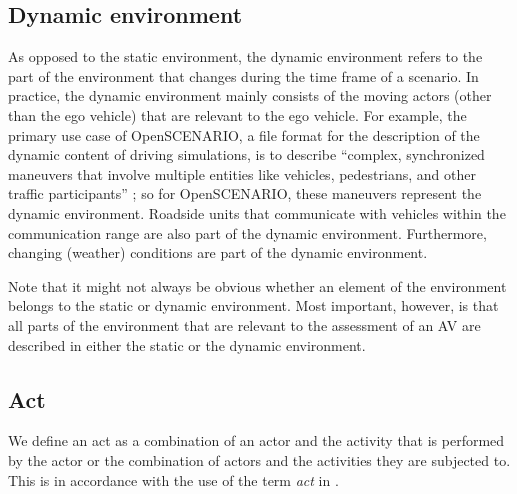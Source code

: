 \subsection{Dynamic environment}
\label{sec:dynamic environment}

As opposed to the static environment, the dynamic environment refers to the part of the environment that changes during the time frame of a scenario. 
In practice, the dynamic environment mainly consists of the moving actors (other than the ego vehicle) that are relevant to the ego vehicle.
For example, the primary use case of OpenSCENARIO, a file format for the description of the dynamic content of driving simulations, is to describe ``complex, synchronized maneuvers that involve multiple entities like vehicles, pedestrians, and other traffic participants'' \autocite{openscenario}; so for OpenSCENARIO, these maneuvers represent the dynamic environment.
Roadside units that communicate with vehicles within the communication range \autocite{alsultan2014comprehensive} are also part of the dynamic environment. Furthermore, changing (weather) conditions are part of the dynamic environment.

\begin{remark}
	Note that it might not always be obvious whether an element of the environment belongs to the static or dynamic environment. 
	Most important, however, is that all parts of the environment that are relevant to the assessment of an AV are described in either the static or the dynamic environment.
\end{remark}



\subsection{Act}
\label{sec:act}

We define an act as a combination of an \cstarte actor \cende and the activity that is performed by the \cstarte actor \cende or the combination of \cstarte actors \cende and the activities they are subjected to.  %
This is in accordance with the use of the term \emph{act} in \autocite{openscenario}. 

